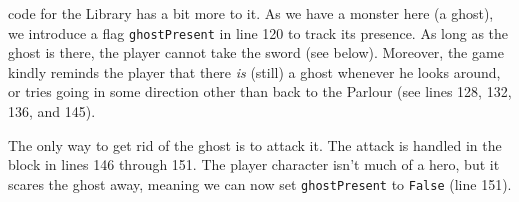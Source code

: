  code for the Library has a bit more to it. As we have a monster here (a ghost), we introduce a flag \texttt{ghostPresent} in line 120 to track its presence. As long as the ghost is there, the player cannot take the sword (see below). Moreover, the game kindly reminds the player that there \emph{is} (still) a ghost whenever he looks around, or tries going in some direction other than back to the Parlour (see lines 128, 132, 136, and 145).   

The only way to get rid of the ghost is to attack it. The attack is handled in the block in lines 146 through 151. The player character isn't much of a hero, but it scares the ghost away, meaning we can now set \texttt{ghostPresent} to \texttt{False} (line 151). 








   